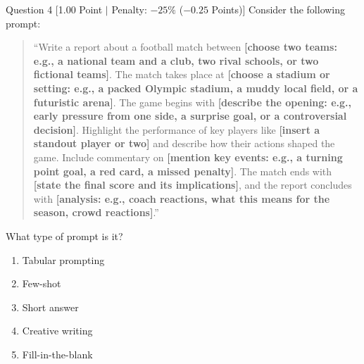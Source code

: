 \documentclass[11pt,a4paper]{article}
\begin{document}
\begin{questionbox}{Question 4 \hfill [1.00 Point $\vert$ Penalty: $-25\%$ ($-0.25$ Points)]}
Consider the following prompt:

\begin{quote}
``Write a report about a football match between \textbf{[choose two teams: e.g., a national team and a club, two rival schools, or two fictional teams]}. The match takes place at \textbf{[choose a stadium or setting: e.g., a packed Olympic stadium, a muddy local field, or a futuristic arena]}. The game begins with \textbf{[describe the opening: e.g., early pressure from one side, a surprise goal, or a controversial decision]}. Highlight the performance of key players like \textbf{[insert a standout player or two]} and describe how their actions shaped the game. Include commentary on \textbf{[mention key events: e.g., a turning point goal, a red card, a missed penalty]}. The match ends with \textbf{[state the final score and its implications]}, and the report concludes with \textbf{[analysis: e.g., coach reactions, what this means for the season, crowd reactions]}.''
\end{quote}

What type of prompt is it?

\begin{enumerate}[label=\alph*.,leftmargin=2em]
    \item Tabular prompting
    \item Few-shot
    \item Short answer
    \item Creative writing
    \item Fill-in-the-blank
\end{enumerate}
\end{questionbox}

\newpage
\end{document}
